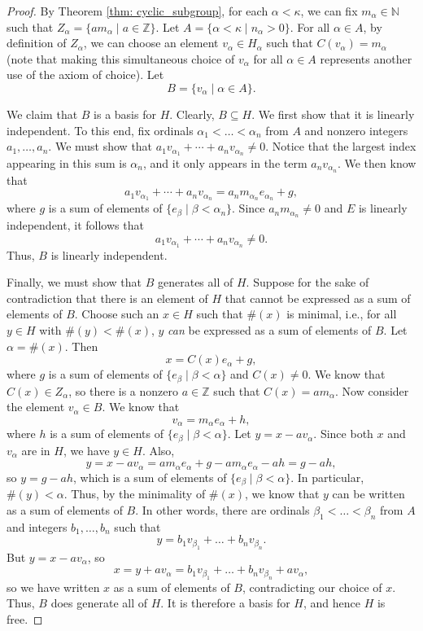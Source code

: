 \documentclass[a4paper]{memoir}
\theoremstyle{definition}
\newcommand{\bb}{\mathbb}
\begin{document}
\begin{proof}
  By Theorem \ref{thm: cyclic_subgroup}, for each $\alpha < \kappa$, we can fix 
  $m_\alpha \in \bb{N}$ such that $Z_\alpha = \{am_\alpha \mid a \in \bb{Z}\}$. 
  Let $A = \{\alpha < \kappa \mid n_\alpha > 0\}$. For all $\alpha \in A$, by definition of $Z_\alpha$, we can 
  choose an element $v_\alpha \in H_\alpha$ such that $C(v_\alpha) = m_\alpha$ 
  (note that making this simultaneous choice of $v_\alpha$ for all $\alpha \in A$
  represents another use of the axiom of choice). Let 
  \[
    B = \{v_\alpha \mid \alpha \in A\}.
  \]
  
  We claim that $B$ is a basis for $H$. Clearly, $B \subseteq H$. 
  We first show that it is linearly independent. To 
  this end, fix ordinals $\alpha_1 < \ldots < \alpha_n$ from $A$ and nonzero integers 
  $a_1, \ldots, a_n$. We must show that $a_1 v_{\alpha_1} + \cdots + 
  a_n v_{\alpha_n} \neq 0$. Notice that the largest index appearing in this sum is 
  $\alpha_n$, and it only appears in the term $a_n v_{\alpha_n}$. We then know that 
  \[
    a_1 v_{\alpha_1} + \cdots + a_n v_{\alpha_n} = a_n m_{\alpha_n} e_{\alpha_n} + g,
  \]
  where $g$ is a sum of elements of $\{e_\beta \mid \beta < \alpha_n\}$. Since 
  $a_n m_{\alpha_n} \neq 0$ and $E$ is linearly independent, it follows that 
  \[
    a_1 v_{\alpha_1} + \cdots + a_n v_{\alpha_n} \neq 0.
  \]
  Thus, $B$ is linearly independent.
  
  Finally, we must show that $B$ generates all of $H$. Suppose for the sake of contradiction 
  that there is an element of $H$ that cannot be expressed as a sum of elements of $B$. 
  Choose such an $x \in H$ such that $\#(x)$ is minimal, i.e., for all $y \in H$ with 
  $\#(y) < \#(x)$, $y$ \emph{can} be expressed as a sum of elements of $B$.
  Let $\alpha = \#(x)$. Then 
  \[
    x = C(x) e_\alpha + g,
  \]
  where $g$ is a sum of elements of $\{e_\beta \mid \beta < \alpha\}$ and 
  $C(x) \neq 0$. We know that $C(x) \in Z_\alpha$, so there is a nonzero $a \in \bb{Z}$ 
  such that $C(x) = am_\alpha$. Now consider the element $v_\alpha \in B$. We know that 
  \[
    v_\alpha = m_\alpha e_\alpha + h,
  \]
  where $h$ is a sum of elements of $\{e_\beta \mid \beta < \alpha\}$.
  Let $y = x - av_\alpha$. Since both $x$ and $v_\alpha$ are in $H$, we have $y \in H$. 
  Also,
  \[
    y = x - av_\alpha = am_\alpha e_\alpha + g - am_\alpha e_\alpha - ah = g - ah,
  \]
  so $y = g - ah$, which is a sum of elements of $\{e_\beta \mid \beta < \alpha\}$. 
  In particular, $\#(y) < \alpha$. Thus, by the minimality of $\#(x)$, we know that 
  $y$ can be written as a sum of elements of $B$. In other words, there are 
  ordinals $\beta_1 < \ldots < \beta_n$ from $A$ and integers $b_1, \ldots, b_n$ 
  such that 
  \[
    y = b_1 v_{\beta_1} + \ldots + b_n v_{\beta_n}.
  \]
  But $y = x - av_\alpha$, so
  \[
    x = y + av_\alpha = b_1 v_{\beta_1} + \ldots + b_n v_{\beta_n} + av_\alpha,
  \]
  so we have written $x$ as a sum of elements of $B$, contradicting our choice of $x$. 
  Thus, $B$ does generate all of $H$. It is therefore a basis for $H$, and hence 
  $H$ is free.
\end{proof}
\end{document}
